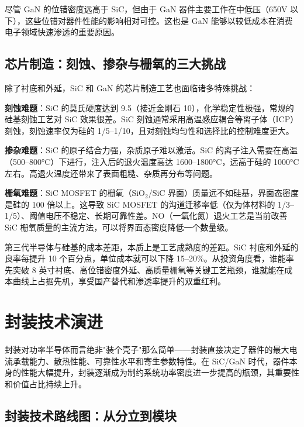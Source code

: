 尽管 GaN 的位错密度远高于 SiC，但由于 GaN 器件主要工作在中低压（650V 以下），这些位错对器件性能的影响相对可控。这也是 GaN 能够以较低成本在消费电子领域快速渗透的重要原因。

\subsection{芯片制造：刻蚀、掺杂与栅氧的三大挑战}

除了衬底和外延，SiC 和 GaN 的芯片制造工艺也面临诸多特殊挑战：

\textbf{刻蚀难题}：SiC 的莫氏硬度达到 9.5（接近金刚石 10），化学稳定性极强，常规的硅基刻蚀工艺对 SiC 效果很差。SiC 刻蚀通常采用高温感应耦合等离子体（ICP）刻蚀，刻蚀速率仅为硅的 1/5–1/10，且对刻蚀均匀性和选择比的控制难度更大。

\textbf{掺杂难题}：SiC 的原子结合力强，杂质原子难以激活。SiC 的离子注入需要在高温（500–800°C）下进行，注入后的退火温度高达 1600–1800°C，远高于硅的 1000°C 左右。高退火温度还带来了表面粗糙、杂质再分布等问题。

\textbf{栅氧难题}：SiC MOSFET 的栅氧（SiO$_\text{2}$/SiC 界面）质量远不如硅基，界面态密度是硅的 100 倍以上。这导致 SiC MOSFET 的沟道迁移率低（仅为体材料的 1/3–1/5）、阈值电压不稳定、长期可靠性差。NO（一氧化氮）退火工艺是当前改善 SiC 栅氧质量的主流方法，可以将界面态密度降低一个数量级。

\begin{keyinsight}[工艺差距 = 成本差距 = 投资机会]
第三代半导体与硅基的成本差距，本质上是工艺成熟度的差距。SiC 衬底和外延的良率每提升 10 个百分点，单位成本就可以下降 15–20\%。从投资角度看，谁能率先突破 8 英寸衬底、高位错密度外延、高质量栅氧等关键工艺瓶颈，谁就能在成本曲线上占据先机，享受国产替代和渗透率提升的双重红利。
\end{keyinsight}

\section{封装技术演进}

封装对功率半导体而言绝非"装个壳子"那么简单——封装直接决定了器件的最大电流承载能力、散热性能、可靠性水平和寄生参数特性。在 SiC/GaN 时代，器件本身的性能大幅提升，封装逐渐成为制约系统功率密度进一步提高的瓶颈，其重要性和价值占比持续上升。

\subsection{封装技术路线图：从分立到模块}


